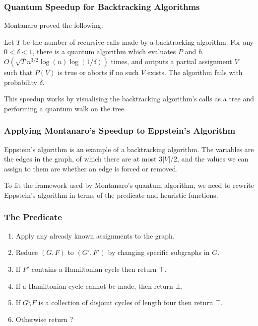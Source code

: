\documentclass[]{beamer}
\begin{document}
\begin{frame}
\frametitle{Quantum Speedup for Backtracking Algorithms}

Montanaro proved the following:

\begin{theorem}[Montanaro]
Let $T$ be the number of recursive calls made by a backtracking algorithm. For any $0 < \delta < 1$, there is a quantum algorithm which evaluates $P$ and $h$ $O(\sqrt{T}n^{3/2}\log(n)\log(1/\delta))$ times, and outputs a partial assignment $V$ such that $P(V)$ is true or aborts if no such $V$ exists. The algorithm fails with probability $\delta$.
\end{theorem}

This speedup works by visualising the backtracking algorithm's calls as a tree and performing a quantum walk on the tree.
\end{frame}

\begin{frame}
\frametitle{Applying Montanaro's Speedup to Eppstein's Algorithm}

Eppstein's algorithm is an example of a backtracking algorithm. The variables are the edges in the graph, of which there are at most $3|V|/2$, and the values we can assign to them are whether an edge is forced or removed.

To fit the framework used by Montanaro's quantum algorithm, we need to rewrite Eppstein's algorithm in terms of the predicate and heuristic functions.
\end{frame}

\begin{frame}
\frametitle{The Predicate}

\begin{enumerate}
\item Apply any already known assignments to the graph.
\item Reduce $(G, F)$ to $(G', F')$ by changing specific subgraphs in $G$.
\item If $F'$ contains a Hamiltonian cycle then return $\top$.
\item If a Hamiltonian cycle cannot be made, then return $\bot$.
\item If $G \setminus F$ is a collection of disjoint cycles of length four then return $\top$.
\item Otherwise return ?
\end{enumerate}
\end{frame}
\end{document}

